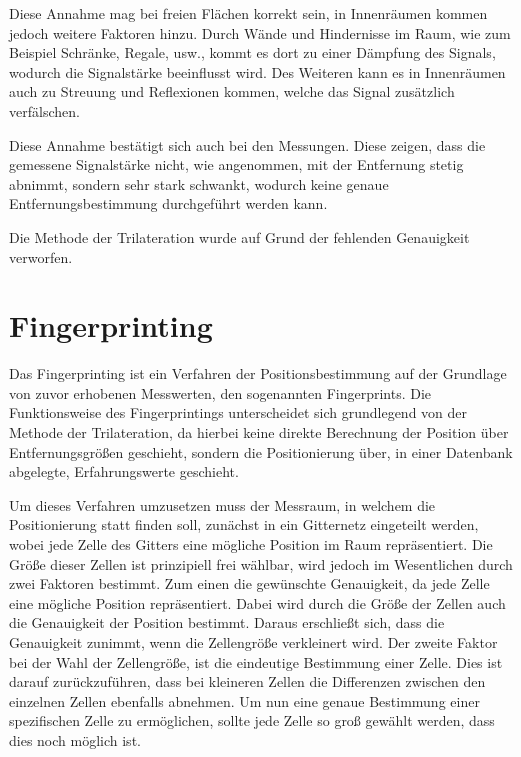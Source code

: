 Diese Annahme mag bei freien Flächen korrekt sein, in Innenräumen kommen jedoch weitere Faktoren hinzu. 
Durch Wände und Hindernisse im Raum, wie zum Beispiel Schränke, Regale, usw., kommt es dort zu einer Dämpfung des Signals, wodurch die Signalstärke beeinflusst wird. Des Weiteren kann es in Innenräumen auch zu Streuung und Reflexionen kommen, welche das Signal zusätzlich verfälschen.

Diese Annahme bestätigt sich auch bei den Messungen. Diese zeigen, dass die gemessene Signalstärke nicht, wie angenommen, mit der Entfernung stetig abnimmt, sondern sehr stark schwankt, wodurch keine genaue Entfernungsbestimmung durchgeführt werden kann.

Die Methode der Trilateration wurde auf Grund der fehlenden Genauigkeit verworfen. 

\section{Fingerprinting}
\label{sec:implementation:fingerprinting}
Das Fingerprinting ist ein Verfahren der Positionsbestimmung auf der Grundlage von zuvor erhobenen Messwerten, den sogenannten Fingerprints.
Die Funktionsweise des Fingerprintings unterscheidet sich grundlegend von der Methode der Trilateration, da hierbei keine direkte Berechnung der Position über Entfernungsgrößen geschieht, sondern die Positionierung über, in einer Datenbank abgelegte, Erfahrungswerte geschieht.

Um dieses Verfahren umzusetzen muss der Messraum, in welchem die Positionierung statt finden soll, zunächst in ein Gitternetz eingeteilt werden, wobei jede Zelle des Gitters eine mögliche Position im Raum repräsentiert. Die Größe dieser Zellen ist prinzipiell frei wählbar, wird jedoch im Wesentlichen durch zwei Faktoren bestimmt. 
Zum einen die gewünschte Genauigkeit, da jede Zelle eine mögliche Position repräsentiert. Dabei wird durch die Größe der Zellen auch die Genauigkeit der Position bestimmt. Daraus erschließt sich, dass die Genauigkeit zunimmt, wenn die Zellengröße verkleinert wird.
Der zweite Faktor bei der Wahl der Zellengröße, ist die eindeutige Bestimmung einer Zelle. Dies ist darauf zurückzuführen, dass bei kleineren Zellen die Differenzen zwischen den einzelnen Zellen ebenfalls abnehmen. Um nun eine genaue Bestimmung einer spezifischen Zelle zu ermöglichen, sollte jede Zelle so groß gewählt werden, dass dies noch möglich ist.

